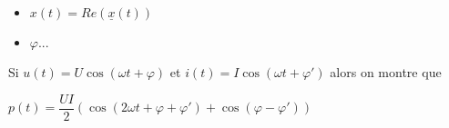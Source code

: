 \begin{resultat}
\begin{itemize}
\item $x(t) = Re\left(\underline{x}(t)\right)$
\item $\varphi ... $
\end{itemize}
\end{resultat}



\begin{resultat}
Si $u(t)=U\cos\left(\omega t + \varphi\right)$
et 
$i(t)=I\cos\left(\omega t + \varphi'\right)$ 
alors on montre que 

$p(t)=\dfrac{UI}{2}\left( \cos\left(2\omega t + \varphi + \varphi' \right)+\cos\left(\varphi -\varphi' \right)\right)$
\end{resultat}